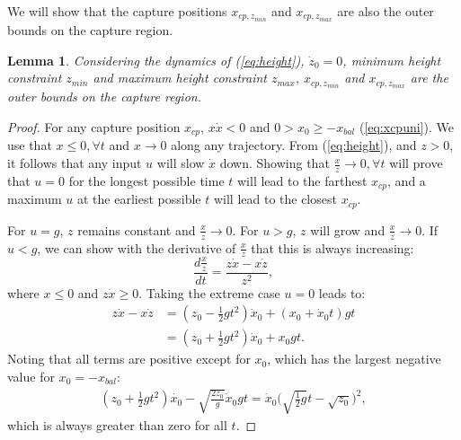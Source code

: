 \documentclass[letterpaper, 10 pt, conference]{ieeeconf}  %
\newcommand{\zmin}{z_{min}}
\newcommand{\zmax}{z_{max}}
\newtheorem{lem}{Lemma}
\begin{document}
We will show that the capture positions $x_{cp,\zmin}$ and $x_{cp,\zmax}$ are also the outer bounds on the capture region.

\begin{lem}\label{lem:regionz}
Considering the dynamics of (\ref{eq:height}), $\dot{z}_0=0$, minimum height constraint $\zmin$ and maximum height constraint $\zmax$, $x_{cp,\zmin}$ and $x_{cp,\zmax}$ are the outer bounds on the capture region.
\end{lem}
\begin{proof}
For any capture position $x_{cp}$, $x\dot{x}<0$ \cite{koolen2016balance} and $0>x_0\geq-x_{bal}$ (\ref{eq:xcpuni}). 
We use that $x \leq 0, \forall t$ and $x\rightarrow 0$ along any trajectory. From (\ref{eq:height}), and $z>0$, it follows that any input $u$ will slow $\dot{x}$ down. Showing that $\frac{x}{z}\rightarrow 0, \forall t$ will prove that $u=0$ for the longest possible time $t$ will lead to the farthest $x_{cp}$, and a maximum $u$ at the earliest possible $t$ will lead to the closest $x_{cp}$. 

For $u=g$, $z$ remains constant and $\frac{x}{z}\rightarrow 0$. For $u>g$, $z$ will grow and $\frac{x}{z}\rightarrow 0$. If $u<g$, we can show with the derivative of $\frac{x}{z}$ that this is always increasing:
\begin{equation}
\frac{d\frac{x}{z}}{dt}= \frac{z\dot{x}-x\dot{z}}{z^2},
\end{equation}
where $x \leq 0$ and $z \dot{x} \geq 0$. Taking the extreme case $u=0$ leads to:
\begin{align}
	z\dot{x}-x\dot{z} &= (z_0 - \frac{1}{2}gt^2)\dot{x}_0 + (x_0 + \dot{x}_0 t)gt\\
	&= (z_0 +\frac{1}{2}gt^2)\dot{x}_0 + x_0gt.
\end{align}
Noting that all terms are positive except for $x_0$, which has the largest negative value for $x_0=-x_{bal}$:
\begin{align}
	(z_0 +\frac{1}{2}gt^2)\dot{x_0} - \sqrt{\frac{2z_0}{g}}\dot{x}_0gt = \dot{x}_0\bigg(\sqrt{\frac{1}{2}g}t - \sqrt{z_0}\bigg)^2,
\end{align}
which is always greater than zero for all $t$.
\end{proof}
\end{document}
